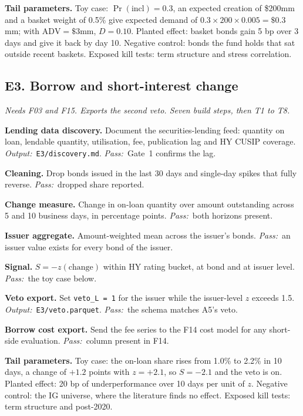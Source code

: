 \documentclass[11pt,letterpaper]{article}
\makeatletter
\newcommand{\code}[1]{\texttt{#1}}
\newcommand{\ADV}{\mathrm{ADV}}
\newcommand*{\twodigit}[1]{\expandafter\@twodigit\csname c@#1\endcsname}
\newcommand*{\@twodigit}[1]{\ifnum#1<10 0\fi\number#1}
\newcommand{\stepname}[1]{\textbf{#1.}}
\newcommand{\Out}{\textit{Output:}~}
\newcommand{\Pass}{\textit{Pass:}~}
\makeatother
\begin{document}
\textbf{Tail parameters.} Toy case: $\Pr(\mathrm{incl})=0.3$, an expected creation of \$200mm and a basket weight of 0.5\% give expected demand of $0.3\times200\times0.005=\$0.3$mm; with $\ADV=\$3$mm, $D=0.10$. Planted effect: basket bonds gain 5 bp over 3 days and give it back by day 10. Negative control: bonds the fund holds that sat outside recent baskets. Exposed kill tests: term structure and stress correlation.

\subsection{E3. Borrow and short-interest change}
\emph{Needs F03 and F15. Exports the second veto. Seven build steps, then T1 to T8.}
\begin{ladder}[label=\textbf{E3.\twodigit*}]
\item \stepname{Lending data discovery} Document the securities-lending feed: quantity on loan, lendable quantity, utilisation, fee, publication lag and HY CUSIP coverage. \Out \code{E3/discovery.md}. \Pass Gate~1 confirms the lag.
\item \stepname{Cleaning} Drop bonds issued in the last 30 days and single-day spikes that fully reverse. \Pass dropped share reported.
\item \stepname{Change measure} Change in on-loan quantity over amount outstanding across 5 and 10 business days, in percentage points. \Pass both horizons present.
\item \stepname{Issuer aggregate} Amount-weighted mean across the issuer's bonds. \Pass an issuer value exists for every bond of the issuer.
\item \stepname{Signal} $S=-z(\text{change})$ within HY rating bucket, at bond and at issuer level. \Pass the toy case below.
\item \stepname{Veto export} Set \code{veto_L = 1} for the issuer while the issuer-level $z$ exceeds 1.5. \Out \code{E3/veto.parquet}. \Pass the schema matches A5's veto.
\item \stepname{Borrow cost export} Send the fee series to the F14 cost model for any short-side evaluation. \Pass column present in F14.
\end{ladder}
\textbf{Tail parameters.} Toy case: the on-loan share rises from 1.0\% to 2.2\% in 10 days, a change of $+1.2$ points with $z=+2.1$, so $S=-2.1$ and the veto is on. Planted effect: 20 bp of underperformance over 10 days per unit of $z$. Negative control: the IG universe, where the literature finds no effect. Exposed kill tests: term structure and post-2020.
\appendix
\end{document}

